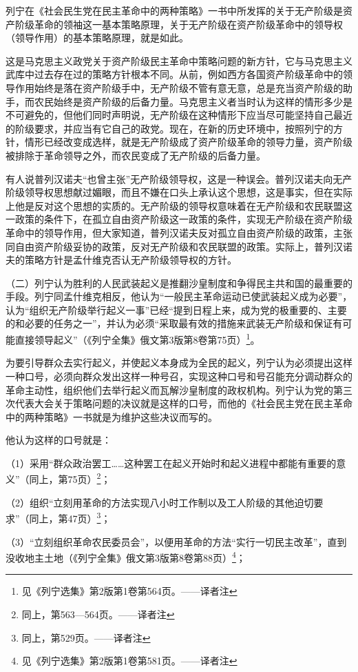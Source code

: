 列宁在《社会民生党在民主革命中的两种策略》一书中所发挥的关于无产阶级是资产阶级革命的领袖这一基本策略原理，关于无产阶级在资产阶级革命中的领导权（领导作用）的基本策略原理，就是如此。

这是马克思主义政党关于资产阶级民主革命中策略问题的新方针，它与马克思主义武库中过去存在过的策略方针根本不同。从前，例如西方各国资产阶级革命中的领导作用始终是落在资产阶级手中，无产阶级不管有意无意，总是充当资产阶级的助手，而农民始终是资产阶级的后备力量。马克思主义者当时认为这样的情形多少是不可避免的，但他们同时声明说，无产阶级在这种情形下应当尽可能坚持自己最近的阶级要求，并应当有它自己的政党。现在，在新的历史环境中，按照列宁的方针，情形已经改变成选样，就是无产阶级成了资产阶级革命的领导力量，资产阶级被排除于革命领导之外，而农民变成了无产阶级的后备力量。

有人说普列汉诺夫“也曾主张”无产阶级领导权，这是一种误会。普列汉诺夫向无产阶级领导权思想献过媚眼，而且不嫌在口头上承认这个思想，这是事实，但在实际上他是反对这个思想的实质的。无产阶级的领导权意味着在无产阶级和农民联盟这一政策的条件下，在孤立自由资产阶级这一政策的条件，实现无产阶级在资产阶级革命中的领导作用，但大家知道，普列汉诺夫反对孤立自由资产阶级的政策，主张同自由资产阶级妥协的政策，反对无产阶级和农民联盟的政策。实际上，普列汉诺夫的策略方针是孟什维克否认无产阶级领导权的方针。

（二）列宁认为胜利的人民武装起义是推翻沙皇制度和争得民主共和国的最重要的手段。列宁同孟什维克相反，他认为“一般民主革命运动已使武装起义成为必要”，认为“组织无产阶级举行起义一事”已经“提到日程上来，成为党的极重要的、主要的和必要的任务之一”，并认为必须“采取最有效的措施来武装无产阶级和保证有可能直接领导起义”（《列宁全集》俄文第3版第8卷第75页）\footnote{见《列宁选集》第2版第1卷第564页。——译者注}。

为要引导群众去实行起义，并使起义本身成为全民的起义，列宁认为必须提出这样一种口号，必须向群众发出这样一种号召，实现这种口号和号召能充分调动群众的革命主动性，组织他们去举行起义而瓦解沙皇制度的政权机构。列宁认为党的第三次代表大会关于策略问题的决议就是这样的口号，而他的《社会民主党在民主革命中的两种策略》一书就是为维护这些决议而写的。

他认为这样的口号就是：

（1）采用“群众政治罢工……这种罢工在起义开始时和起义进程中都能有重要的意义”（同上，第75页）\footnote{同上，第563—564页。——译者注}；

（2）组织“立刻用革命的方法实现八小时工作制以及工人阶级的其他迫切要求”（同上，第47页）\footnote{同上，第529页。——译者注}；

（3）“立刻组织革命农民委员会”，以便用革命的方法“实行一切民主改革”，直到没收地主土地（《列宁全集》俄文第3版第8卷第88页）\footnote{见《列宁选集》第2版第1卷第581页。——译者注}；


